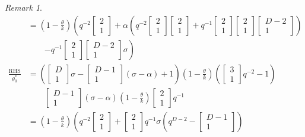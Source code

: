 \documentclass[
]{book}
\theoremstyle{definition}
\theoremstyle{definition}
\theoremstyle{definition}
\theoremstyle{definition}
\theoremstyle{remark}
\newtheorem*{remark}{Remark}
\begin{document}
\begin{remark}
\begin{align}
& = \left(1-\frac{\theta}{k}\right)\left(q^{-2}\begin{bmatrix}{2}\\{1}\end{bmatrix}+\alpha\left(q^{-2}\begin{bmatrix}{2}\\{1}\end{bmatrix}\begin{bmatrix}{2}\\{1}\end{bmatrix}+q^{-1}\begin{bmatrix}{2}\\{1}\end{bmatrix}\begin{bmatrix}{2}\\{1}\end{bmatrix}\begin{bmatrix}{D-2}\\{1}\end{bmatrix}\right)\right.\\
& \qquad \left.-q^{-1}\begin{bmatrix}{2}\\{1}\end{bmatrix}\begin{bmatrix}{D-2}\\{1}\end{bmatrix}\sigma\right)\\
\frac{\mathrm{RHS}}{\theta^*_0} & = \left(\begin{bmatrix}{D}\\{1}\end{bmatrix}\sigma-\begin{bmatrix}{D-1}\\{1}\end{bmatrix}(\sigma-\alpha)+1\right)\left(1-\frac{\theta}{k}\right)\left(\begin{bmatrix}{3}\\{1}\end{bmatrix}q^{-2}-1\right)\\
& \qquad \begin{bmatrix}{D-1}\\{1}\end{bmatrix}(\sigma-\alpha)\left(1-\frac{\theta}{k}\right)\begin{bmatrix}{2}\\{1}\end{bmatrix}q^{-1}\\
& = \left(1-\frac{\theta}{k}\right)\left(q^{-2}\begin{bmatrix}{2}\\{1}\end{bmatrix}+\begin{bmatrix}{2}\\{1}\end{bmatrix}q^{-1}\sigma\left(q^{D-2}-\begin{bmatrix}{D-1}\\{1}\end{bmatrix}\right)\right.\\

\end{align}
\end{remark}
\end{document}
